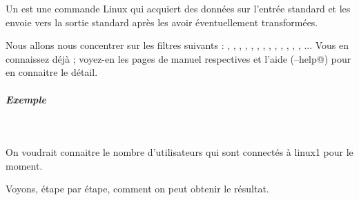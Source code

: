 \documentclass[11pt,a4paper]{article}
\begin{document}
            \par
        
			\begin{boxedminipage}[h]{\linewidth}
		
					Un \verb@filtre@
					est une commande Linux 
					qui acquiert des donn\'ees sur l'entr\'ee standard 
					et les envoie vers la sortie standard 
					apr\`es les avoir \'eventuellement transform\'ees.
				
			\end{boxedminipage}

					Nous allons nous concentrer sur les
					filtres suivants :
					\verb@tr@, 
					\verb@cut@,
					\verb@cat@, 
					\verb@sort@, 
					\verb@head@,
					\verb@tail@, 
					\verb@split@, 
					\verb@uniq@,
					\verb@grep@, 
					\verb@more@, 
					\verb@less@,
					\verb@wc@, 
					\verb@grep@, ...
					Vous en connaissez d\'ej\`a ;
					voyez-en les pages de manuel respectives et l'aide 
					(\verb@--help@) 
					pour en connaitre le d\'etail.
				
            \par
        
			
		\subparagraph{Exemple} 
		
					\textcolor{white}{.} \par
				
            \par
        
					On voudrait connaitre 
					le nombre d'utilisateurs qui
					sont connect\'es \`a linux1 pour le moment.
				
            \par
        
					Voyons, \'etape par \'etape, comment on peut
					obtenir le r\'esultat.
				
            \par
        
\end{document}
